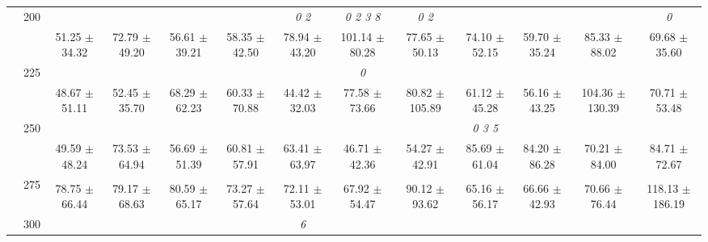 \begin{table}[h]
{\begin{tabular}{
        ccccccccccccc}
 & \multirow{2}{*}{200}& & & & & \textit{ 0 2 }& \textit{ 0 2 3 8 }& \textit{ 0 2 }& & & & \textit{ 0 } \\ 
 & & 51.25 $\pm$ 34.32& 72.79 $\pm$ 49.20& 56.61 $\pm$ 39.21& 58.35 $\pm$ 42.50& 78.94 $\pm$ 43.20& 101.14 $\pm$ 80.28& 77.65 $\pm$ 50.13& 74.10 $\pm$ 52.15& 59.70 $\pm$ 35.24& 85.33 $\pm$ 88.02& 69.68 $\pm$ 35.60 \\ 
 & \multirow{2}{*}{225}& \cellcolor[HTML]{EFEFEF} & \cellcolor[HTML]{EFEFEF} & \cellcolor[HTML]{EFEFEF} & \cellcolor[HTML]{EFEFEF} & \cellcolor[HTML]{EFEFEF} & \cellcolor[HTML]{EFEFEF} \textit{ 0 }& \cellcolor[HTML]{EFEFEF} & \cellcolor[HTML]{EFEFEF} & \cellcolor[HTML]{EFEFEF} & \cellcolor[HTML]{EFEFEF} & \cellcolor[HTML]{EFEFEF}  \\ 
 & & \cellcolor[HTML]{EFEFEF} 48.67 $\pm$ 51.11& \cellcolor[HTML]{EFEFEF} 52.45 $\pm$ 35.70& \cellcolor[HTML]{EFEFEF} 68.29 $\pm$ 62.23& \cellcolor[HTML]{EFEFEF} 60.33 $\pm$ 70.88& \cellcolor[HTML]{EFEFEF} 44.42 $\pm$ 32.03& \cellcolor[HTML]{EFEFEF} 77.58 $\pm$ 73.66& \cellcolor[HTML]{EFEFEF} 80.82 $\pm$ 105.89& \cellcolor[HTML]{EFEFEF} 61.12 $\pm$ 45.28& \cellcolor[HTML]{EFEFEF} 56.16 $\pm$ 43.25& \cellcolor[HTML]{EFEFEF} 104.36 $\pm$ 130.39& \cellcolor[HTML]{EFEFEF} 70.71 $\pm$ 53.48 \\ 
 & \multirow{2}{*}{250}& & & & & & & & \textit{ 0 3 5 }& & &  \\ 
 & & 49.59 $\pm$ 48.24& 73.53 $\pm$ 64.94& 56.69 $\pm$ 51.39& 60.81 $\pm$ 57.91& 63.41 $\pm$ 63.97& 46.71 $\pm$ 42.36& 54.27 $\pm$ 42.91& 85.69 $\pm$ 61.04& 84.20 $\pm$ 86.28& 70.21 $\pm$ 84.00& 84.71 $\pm$ 72.67 \\ 
 & \multirow{2}{*}{275}& \cellcolor[HTML]{EFEFEF} & \cellcolor[HTML]{EFEFEF} & \cellcolor[HTML]{EFEFEF} & \cellcolor[HTML]{EFEFEF} & \cellcolor[HTML]{EFEFEF} & \cellcolor[HTML]{EFEFEF} & \cellcolor[HTML]{EFEFEF} & \cellcolor[HTML]{EFEFEF} & \cellcolor[HTML]{EFEFEF} & \cellcolor[HTML]{EFEFEF} & \cellcolor[HTML]{EFEFEF}  \\ 
 & & \cellcolor[HTML]{EFEFEF} 78.75 $\pm$ 66.44& \cellcolor[HTML]{EFEFEF} 79.17 $\pm$ 68.63& \cellcolor[HTML]{EFEFEF} 80.59 $\pm$ 65.17& \cellcolor[HTML]{EFEFEF} 73.27 $\pm$ 57.64& \cellcolor[HTML]{EFEFEF} 72.11 $\pm$ 53.01& \cellcolor[HTML]{EFEFEF} 67.92 $\pm$ 54.47& \cellcolor[HTML]{EFEFEF} 90.12 $\pm$ 93.62& \cellcolor[HTML]{EFEFEF} 65.16 $\pm$ 56.17& \cellcolor[HTML]{EFEFEF} 66.66 $\pm$ 42.93& \cellcolor[HTML]{EFEFEF} 70.66 $\pm$ 76.44& \cellcolor[HTML]{EFEFEF} 118.13 $\pm$ 186.19 \\ 
 & \multirow{2}{*}{300}& & & & & \textit{ 6 }& & & & & &  \\ 

\end{tabular}}
\end{table}
